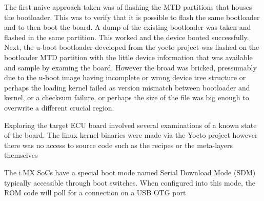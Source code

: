 The first naive approach taken was of flashing the MTD partitions that houses the bootloader. This was to verify that it is possible to flash the same bootloader and to then boot the board. A dump of the existing bootloader was taken and flashed in the same partition. This worked and the device booted successfully. Next, the u-boot bootloader developed from the yocto project was flashed on the bootloader MTD partition with the little device information that was available and sample by examing the board. However the broad was bricked, pressumably due to the u-boot image having incomplete or wrong device tree structure or perhaps the loading kernel failed as version mismatch between bootloader and kernel, or a checksum failure, or perhaps the size of the file was big enough to overwrite a different crucial region.




Exploring the target ECU board involved several examinations of a known state of the board. The linux kernel binaries were made via the Yocto project however there was no access to source code such as the recipes or the meta-layers themselves

The i.MX SoCs have a special boot mode named Serial Download Mode (SDM) typically accessible through boot switches. When configured into this mode, the ROM code will poll for a connection on a USB OTG port
